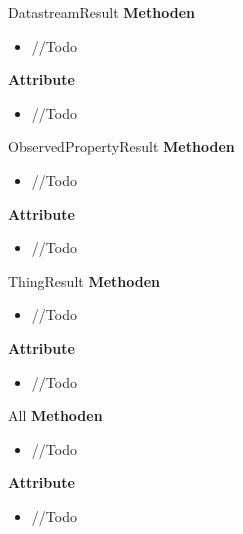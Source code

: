 \begin{Class}{DatastreamResult}
    \textbf{Methoden}
    \begin{itemize}
        \item //Todo
    \end{itemize}
    
    \textbf{Attribute}
    \begin{itemize}
        \item //Todo
    \end{itemize}
\end{Class}

\begin{Class}{ObservedPropertyResult}
    \textbf{Methoden}
    \begin{itemize}
        \item //Todo
    \end{itemize}
    
    \textbf{Attribute}
    \begin{itemize}
        \item //Todo
    \end{itemize}
\end{Class}

\begin{Class}{ThingResult}
    \textbf{Methoden}
    \begin{itemize}
        \item //Todo
    \end{itemize}
    
    \textbf{Attribute}
    \begin{itemize}
        \item //Todo
    \end{itemize}
\end{Class}

\begin{Class}{All}
    \textbf{Methoden}
    \begin{itemize}
        \item //Todo
    \end{itemize}
    
    \textbf{Attribute}
    \begin{itemize}
        \item //Todo
    \end{itemize}
\end{Class}

